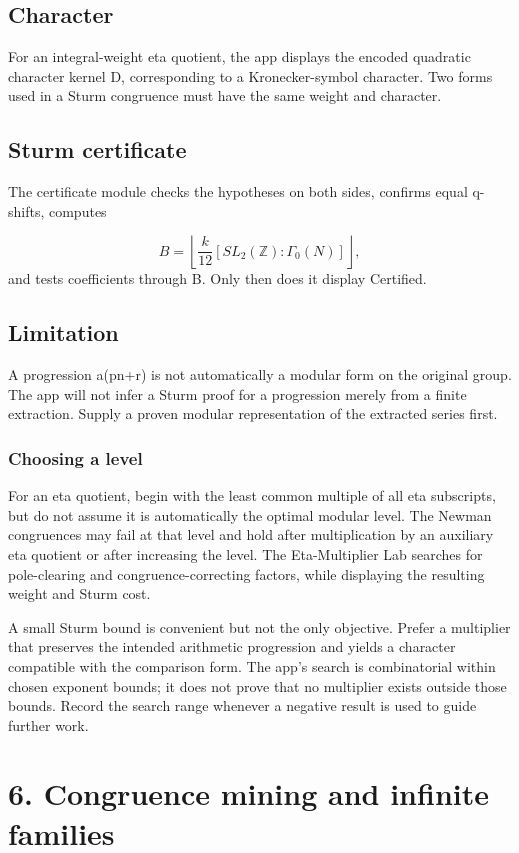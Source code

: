 \documentclass[11pt]{article}
\begin{document}
\subsection*{Character}
For an integral-weight eta quotient, the app displays the encoded quadratic character kernel D, corresponding to a Kronecker-symbol character. Two forms used in a Sturm congruence must have the same weight and character.

\subsection*{Sturm certificate}
The certificate module checks the hypotheses on both sides, confirms equal q-shifts, computes

\[
B=\left\lfloor \frac{k}{12}[SL_2(\mathbb Z):\Gamma_0(N)]\right\rfloor,
\]
and tests coefficients through B. Only then does it display Certified.

\subsection*{Limitation}
A progression a(pn+r) is not automatically a modular form on the original group. The app will not infer a Sturm proof for a progression merely from a finite extraction. Supply a proven modular representation of the extracted series first.

\subsubsection*{Choosing a level}
For an eta quotient, begin with the least common multiple of all eta subscripts, but do not assume it is automatically the optimal modular level. The Newman congruences may fail at that level and hold after multiplication by an auxiliary eta quotient or after increasing the level. The Eta-Multiplier Lab searches for pole-clearing and congruence-correcting factors, while displaying the resulting weight and Sturm cost.

A small Sturm bound is convenient but not the only objective. Prefer a multiplier that preserves the intended arithmetic progression and yields a character compatible with the comparison form. The app's search is combinatorial within chosen exponent bounds; it does not prove that no multiplier exists outside those bounds. Record the search range whenever a negative result is used to guide further work.

\newpage
\section{6. Congruence mining and infinite families}
\end{document}
